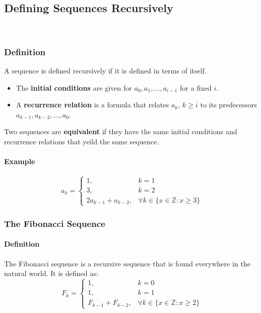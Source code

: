 \subsection{Defining Sequences Recursively}
\hrulefill\\
\subsubsection*{Definition}
A sequence is defined recursively if it is defined in terms of itself.
\begin{itemize}
    \item The \textbf{initial conditions} are given for $a_0, a_1, \dots, a_{i-1}$ for a fixed $i$.
    \item A \textbf{recurrence relation} is a formula that relates $a_k$, $k \geq i$ to its predecessors $a_{k-1}, a_{k-2}, \dots, a_{0}$.
\end{itemize}

Two sequences are \textbf{equivalent} if they have the same initial conditions and recurrence relations that yeild the same sequence.

\paragraph*{Example}
\begin{equation*}
    a_k = 
    \begin{cases}
        1, & k = 1\\
        3, & k = 2\\
        2a_{k-1} + a_{k-2}, & \forall k \in \{x \in \mathbb{Z} : x \geq 3\}
    \end{cases}
\end{equation*}

\subsubsection*{The Fibonacci Sequence}
\paragraph*{Definition}
The Fibonacci sequence is a recursive sequence that is found everywhere in the natural world. It is defined as:
\begin{equation*}
    F_k =
    \begin{cases}
        1, & k = 0\\
        1, & k = 1\\
        F_{k-1} + F_{k-2}, & \forall k \in \{x \in \mathbb{Z} : x \geq 2\}
    \end{cases}
\end{equation*}